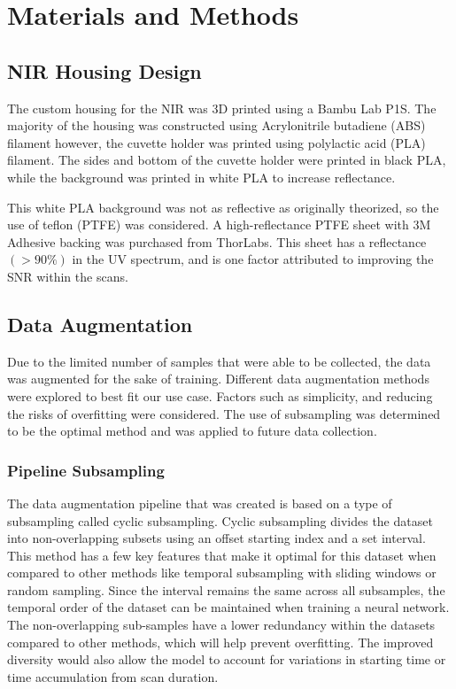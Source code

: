 \documentclass[final, 3p, 11pt]{elsarticle}
\begin{document}

\section{Materials and Methods}

\subsection{NIR Housing Design}
The custom housing for the NIR was 3D printed using a Bambu Lab P1S. The majority of the housing was constructed using Acrylonitrile butadiene (ABS) filament however, the cuvette holder was printed using polylactic acid (PLA) filament. The sides and bottom of the cuvette holder were printed in black PLA, while the background was printed in white PLA to increase reflectance. 

This white PLA background was not as reflective as originally theorized, so the use of teflon (PTFE) was considered. A high-reflectance PTFE sheet with 3M Adhesive backing was purchased from ThorLabs. This sheet has a reflectance $( >90\%)$ in the UV spectrum, and is one factor attributed to improving the SNR within the scans.

\subsection{Data Augmentation}
Due to the limited number of samples that were able to be collected, the data was augmented for the sake of training. Different data augmentation methods were explored to best fit our use case. Factors such as simplicity, and reducing the risks of overfitting were considered. The use of subsampling was determined to be the optimal method and was applied to future data collection.

\subsubsection{Pipeline Subsampling}
The data augmentation pipeline that was created is based on a type of subsampling called cyclic subsampling. Cyclic subsampling divides the dataset into non-overlapping subsets using an offset starting index and a set interval. This method has a few key features that make it optimal for this dataset when compared to other methods like temporal subsampling with sliding windows or random sampling. Since the interval remains the same across all subsamples, the temporal order of the dataset can be maintained when training a neural network. The non-overlapping sub-samples have a lower redundancy within the datasets compared to other methods, which will help prevent overfitting. The improved diversity would also allow the model to account for variations in starting time or time accumulation from scan duration.
\end{document}
